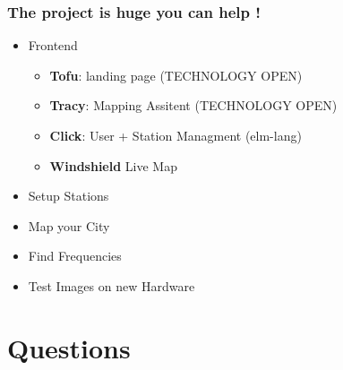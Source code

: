 \documentclass[aspectratio=169]{beamer}
\begin{document}
\begin{frame}
\frametitle{The project is huge you can help !}

\begin{itemize}
  \item Frontend
        \begin{itemize}
          \item \textbf{Tofu}: landing page (TECHNOLOGY OPEN)
          \item \textbf{Tracy}: Mapping Assitent (TECHNOLOGY OPEN)
          \item \textbf{Click}: User + Station Managment (elm-lang)
          \item \textbf{Windshield} Live Map
        \end{itemize}
  \item Setup Stations
  \item Map your City
  \item Find Frequencies
  \item Test Images on new Hardware
\end{itemize}

\end{frame}


\section{Questions}
\end{document}
